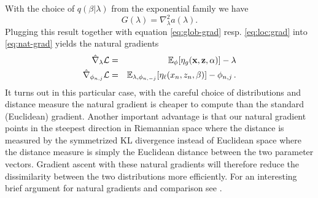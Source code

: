 \documentclass[12pt,abstracton,a4paper]{scrartcl}
\def\x{{\bf x}}
\def\z{{\bf z}}
\begin{document}
With the choice of $q(\beta|\lambda)$ from the exponential family we have 
\begin{equation}
G(\lambda) = \nabla^2_\lambda a(\lambda).
\end{equation}
Plugging this result together with equation \ref{eq:glob-grad} resp. \ref{eq:loc:grad} into \ref{eq:nat-grad} yields the natural gradients
\begin{eqnarray}
\hat\nabla_\lambda \mathcal L &=& 
 \mathbb E_\phi[\eta_g(\x,\z,\alpha)] - \lambda   \\
\hat\nabla_{\phi_{n,j}} \mathcal L &=& 
 \mathbb E_{\lambda,\phi_{n,-j}}[\eta_\ell(x_n,z_n,\beta)] - \phi_{n,j} \, .
\end{eqnarray}
It turns out in this particular case, with the careful choice of distributions and distance measure the natural gradient is cheaper to compute than the standard (Euclidean) gradient. Another important advantage is that our natural gradient points in the steepest direction in Riemannian space where the distance is measured by the symmetrized KL divergence instead of Euclidean space where the distance measure is simply the Euclidean distance between the two parameter vectors. Gradient ascent with these natural gradients will therefore reduce the dissimilarity between the two distributions more efficiently. For an interesting brief argument for natural gradients and comparison see \cite{Amari98}.







\printbibliography
\end{document}
